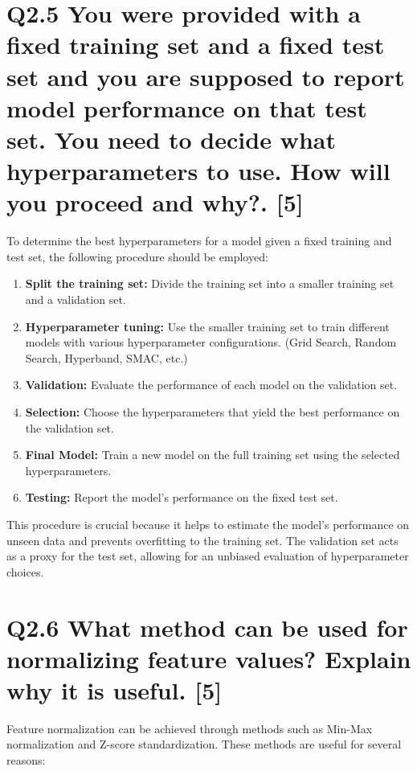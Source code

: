 \documentclass[11pt]{article}
\begin{document}
\section{Q2.5 You were provided with a fixed training set and a fixed test set and you are supposed to report model performance on that test set. You need to decide what hyperparameters to use. How will you proceed and why?. [5]}

To determine the best hyperparameters for a model given a fixed training and test set, the following procedure should be employed:

\begin{enumerate}
    \item \textbf{Split the training set:} Divide the training set into a smaller training set and a validation set.
    \item \textbf{Hyperparameter tuning:} Use the smaller training set to train different models with various hyperparameter configurations. (Grid Search, Random Search, Hyperband, SMAC, etc.)
    \item \textbf{Validation:} Evaluate the performance of each model on the validation set.
    \item \textbf{Selection:} Choose the hyperparameters that yield the best performance on the validation set.
    \item \textbf{Final Model:} Train a new model on the full training set using the selected hyperparameters.
    \item \textbf{Testing:} Report the model's performance on the fixed test set.
\end{enumerate}

This procedure is crucial because it helps to estimate the model's performance on unseen data and prevents overfitting to the training set. The validation set acts as a proxy for the test set, allowing for an unbiased evaluation of hyperparameter choices.

\section{Q2.6 What method can be used for normalizing feature values? Explain why it is useful. [5]}

Feature normalization can be achieved through methods such as Min-Max normalization and Z-score standardization. These methods are useful for several reasons:
\end{document}
